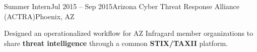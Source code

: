 
\def\PositionTitle{Summer Intern}
\def\PositionPeriod{Jul 2015 -- Sep 2015} %
\def\OrgName{Arizona Cyber Threat Response Alliance (ACTRA)}
\def\OrgLocation{Phoenix, AZ}


\begin{rExperience}{\PositionTitle}{\PositionPeriod}{\OrgName}{\OrgLocation}

  \item Designed an operationalized workflow for AZ Infragard member organizations to share \textbf{threat intelligence} through a common \textbf{STIX/TAXII} platform.


\end{rExperience}
